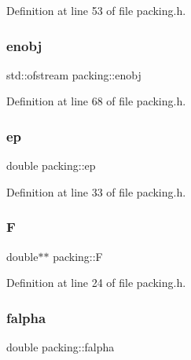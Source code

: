 Definition at line 53 of file packing.\+h.

\mbox{\label{classpacking_acc65e17d00c4ae7ed3efee0da9693144}} 
\subsubsection{\texorpdfstring{enobj}{enobj}}
{\footnotesize\ttfamily std\+::ofstream packing\+::enobj\hspace{0.3cm}{\ttfamily [protected]}}



Definition at line 68 of file packing.\+h.

\mbox{\label{classpacking_a1c04efa5180dbc7100daa11b1b0728f7}} 
\subsubsection{\texorpdfstring{ep}{ep}}
{\footnotesize\ttfamily double packing\+::ep\hspace{0.3cm}{\ttfamily [protected]}}



Definition at line 33 of file packing.\+h.

\mbox{\label{classpacking_a39113604e4ffe9563e79e8289e6eed61}} 
\subsubsection{\texorpdfstring{F}{F}}
{\footnotesize\ttfamily double$\ast$$\ast$ packing\+::F\hspace{0.3cm}{\ttfamily [protected]}}



Definition at line 24 of file packing.\+h.

\mbox{\label{classpacking_a6bd8393eedd89fe3082be57be371dbaf}} 
\subsubsection{\texorpdfstring{falpha}{falpha}}
{\footnotesize\ttfamily double packing\+::falpha\hspace{0.3cm}{\ttfamily [protected]}}



